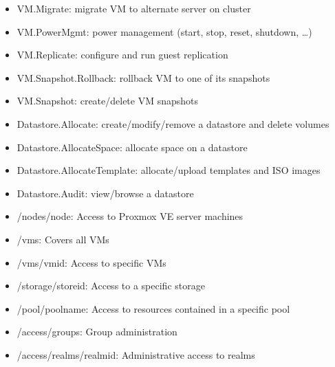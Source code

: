 \begin{itemize}[leftmargin=2cm]
	\item VM.Migrate: migrate VM to alternate server on cluster

	\item VM.PowerMgmt: power management (start, stop, reset, shutdown, …)

	\item VM.Replicate: configure and run guest replication

	\item VM.Snapshot.Rollback: rollback VM to one of its snapshots

	\item VM.Snapshot: create/delete VM snapshots

\end{itemize}

\begin{itemize}[leftmargin=2cm]

	\item Datastore.Allocate: create/modify/remove a datastore and delete volumes

	\item Datastore.AllocateSpace: allocate space on a datastore

	\item Datastore.AllocateTemplate: allocate/upload templates and ISO images

	\item Datastore.Audit: view/browse a datastore

\end{itemize}

\begin{itemize}[leftmargin=2cm]

	\item /nodes/{node}: Access to Proxmox VE server machines

	\item /vms: Covers all VMs

	\item /vms/{vmid}: Access to specific VMs

	\item /storage/{storeid}: Access to a specific storage

	\item /pool/{poolname}: Access to resources contained in a specific pool

	\item /access/groups: Group administration

	\item /access/realms/{realmid}: Administrative access to realms

\end{itemize}

